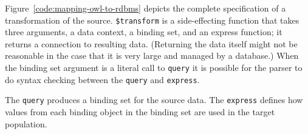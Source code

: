 \documentclass[10pt,letterpaper]{article} %
\newcommand{\stt}[1]{\texttt{#1}} %
\begin{document}
%

Figure~\ref{code:mapping-owl-to-rdbms} depicts the complete specification of a transformation of the source.
\stt{\$transform} is a side-effecting function that takes three arguments, a data context, a binding set, and an express function;
it returns a connection to resulting data.
(Returning the data itself might not be reasonable in the case that it is very large and managed by a database.)
When the binding set argument is a literal call to \stt{query} it is possible for the parser to do syntax checking between
the \stt{query} and \stt{express}.

The \stt{query} produces a binding set for the source data.
The \stt{express} defines how values from each binding object in the binding set are used in the target population.

\end{document}
